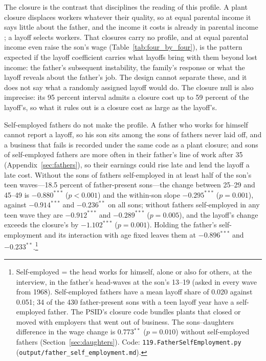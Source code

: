 

The closure is the contrast that disciplines the reading of this profile. A plant closure displaces workers whatever their quality,
so at equal parental income it says little about the father, and the income it costs is already in parental income
\citep{gibbons1991layoffs}; a layoff selects workers. That closures carry no profile, and at equal parental income even
raise the son's wage (Table~\ref{tab:four_by_four}), is the pattern expected if the layoff coefficient carries what
layoffs bring with them beyond lost income: the father's subsequent instability, the family's response or what the
layoff reveals about the father's job. The design cannot separate these, and it does not say what a randomly assigned
layoff would do. The closure null is also imprecise: its 95 percent interval admits a closure cost up to 59 percent of
the layoff's, so what it rules out is a closure cost as large as the layoff's.

Self-employed fathers do not make the profile. A father who works for himself cannot report a layoff, so his son sits
among the sons of fathers never laid off, and a business that fails is recorded under the same code as a plant
closure; and sons of self-employed fathers are more often in their father's line of work after 35
(Appendix~\ref{sec:fathers}), so their earnings could rise late and lend the layoff a late cost. Without the sons of
fathers self-employed in at least half of the son's teen waves---18.5 percent of father-present sons---the change
between 25--29 and 45--49 is $-0.880^{***}$ ($p<0.001$) and the within-son slope $-0.295^{***}$ ($p = 0.001$), against
$-0.914^{***}$ and $-0.236^{**}$ on all sons; without fathers self-employed in any teen wave they are $-0.912^{***}$ and
$-0.289^{***}$ ($p = 0.005$), and the layoff's change exceeds the closure's by $-1.102^{***}$ ($p = 0.001$). Holding the
father's self-employment and its interaction with age fixed leaves them at $-0.896^{***}$ and
$-0.233^{**}$.\footnote{Self-employed = the head works for himself, alone or also for others, at the interview, in the
father's head-waves at the son's 13--19 (asked in every wave from 1968). Self-employed fathers have a mean layoff share of
0.020 against 0.051; 34 of the 430 father-present sons with a teen layoff year have a self-employed father. The PSID's
closure code bundles plants that closed or moved with employers that went out of business. The sons--daughters
difference in the wage change is 0.773$^{**}$ ($p = 0.010$) without self-employed fathers (Section~\ref{sec:daughters}).
Code: \texttt{119.FatherSelfEmployment.py} (\texttt{output/father\_self\_employment.md}).}

